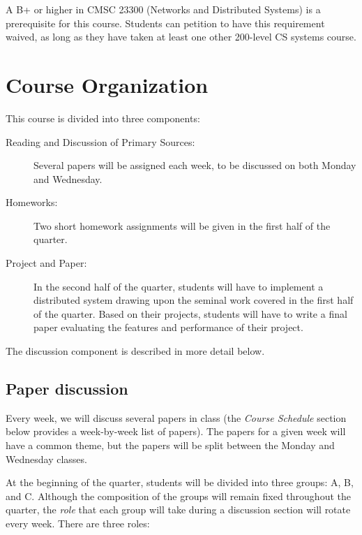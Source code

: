 \documentclass[11pt]{article}
\begin{document}
A B+ or higher in CMSC 23300 (Networks and Distributed Systems) is a prerequisite for this course. Students can petition to have this requirement waived, as long as they have taken at least one other 200-level CS systems course.

\pagebreak

\section{Course Organization}

This course is divided into three components:

\begin{description}

 \item[Reading and Discussion of Primary Sources:] Several papers will be assigned each week, to be discussed on both Monday and Wednesday.

 \item[Homeworks:] Two short homework assignments will be given in the first half of the quarter.
 
 \item[Project and Paper:] In the second half of the quarter, students will have to implement a distributed system drawing upon the seminal work covered in the first half of the quarter. Based on their projects, students will have to write a final paper evaluating the features and performance of their project.

\end{description}

The discussion component is described in more detail below.

\subsection{Paper discussion}

Every week, we will discuss several papers in class (the \emph{Course Schedule} section below provides a week-by-week list of papers). The papers for a given week will have a common theme, but the papers will be split between the Monday and Wednesday classes. 

At the beginning of the quarter, students will be divided into three groups: A, B, and C. Although the composition of the groups will remain fixed throughout the quarter, the \emph{role} that each group will take during a discussion section will rotate every week. There are three roles:
\end{document}

